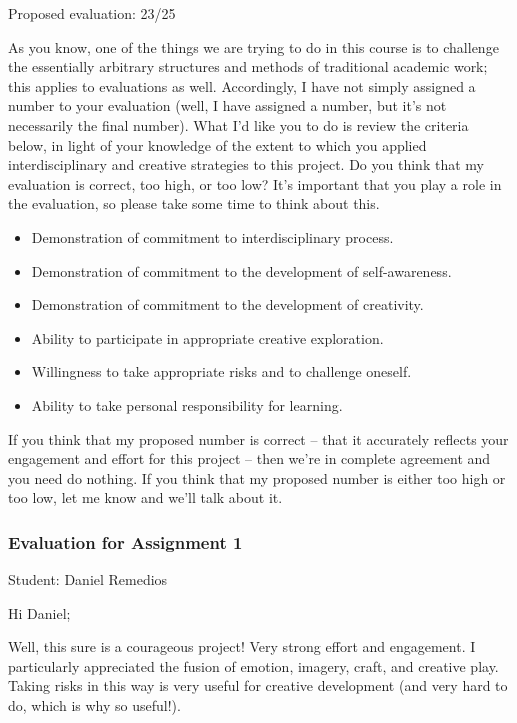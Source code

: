 \documentclass[letterpaper,10pt,DIV=9,headsepline]{scrreprt}
\begin{document}
\bigskip
Proposed evaluation: 23/25

\bigskip
As you know, one of the things we are trying to do in this course is
to challenge the essentially arbitrary structures and methods of
traditional academic work; this applies to evaluations as well.
Accordingly, I have not simply assigned a number to your evaluation
(well, I have assigned a number, but it's not necessarily the final
number). What I'd like you to do is review the criteria below, in
light of your knowledge of the extent to which you applied
interdisciplinary and creative strategies to this project. Do you
think that my evaluation is correct, too high, or too low? It's
important that you play a role in the evaluation, so please take some
time to think about this.

\begin{itemize}
\item Demonstration of commitment to interdisciplinary process.
\item Demonstration of commitment to the development of self-awareness.
\item Demonstration of commitment to the development of creativity.
\item Ability to participate in appropriate creative exploration.
\item Willingness to take appropriate risks and to challenge oneself.
\item Ability to take personal responsibility for learning.
\end{itemize}

If you think that my proposed number is correct -- that it accurately
reflects your engagement and effort for this project -- then we're in
complete agreement and you need do nothing. If you think that my
proposed number is either too high or too low, let me know and we'll
talk about it.

\newpage

\subsubsection{Evaluation for Assignment 1}

Student: Daniel Remedios

\bigskip
Hi Daniel;

Well, this sure is a courageous project! Very strong effort and engagement. I
particularly appreciated the fusion of emotion, imagery, craft, and
creative play. Taking risks in this way is very useful for creative development (and very hard to do, which is why so useful!).
\end{document}
